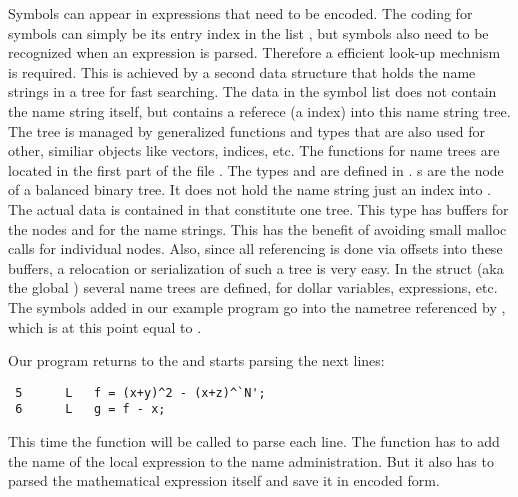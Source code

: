 Symbols can appear in expressions that need to be encoded. The coding for
symbols can simply be its entry index in the list , but symbols
also need to be recognized when an expression is parsed. Therefore a efficient
look-up mechnism is required. This is achieved by a second data structure that
holds the name strings in a tree for fast searching. The data in the symbol list
does not contain the name string itself, but contains a referece (a index) into
this name string tree. The tree is managed by generalized functions and types
that are also used for other, similiar objects like vectors, indices, etc. The
functions for name trees are located in the first part of the file .
The types  and  are defined in .
s are the node of a balanced binary tree. It does not hold the
name string just an index into . The actual data is contained in 
 that constitute one tree. This type has buffers for the nodes and
for the name strings. This has the benefit of avoiding small malloc calls for
individual nodes. Also, since all referencing is done via offsets into these
buffers, a relocation or serialization of such a tree is very easy. In the
struct  (aka the global ) several name trees are defined, for
dollar variables, expressions, etc. The symbols added in our example program go
into the nametree referenced by , which is at this point equal
to .

Our program returns to the  and starts parsing the next lines:

\begin{verbatim}
 5      L	f = (x+y)^2 - (x+z)^`N';
 6      L	g = f - x;
\end{verbatim}

This time the function  will be called to parse each line. The
function has to add the name of the local expression to the name administration.
But it also has to parsed the mathematical expression itself and save it in
encoded form.













